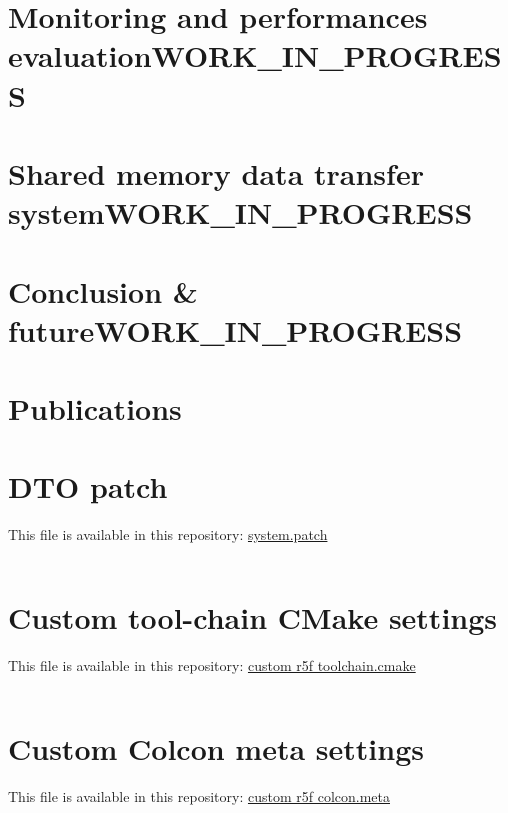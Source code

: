\documentclass[10pt]{article}
\begin{document}
\section{Monitoring and performances evaluation\hfill{}\textsc{WORK\_IN\_PROGRESS}}
\label{sec:orgccd1fd5}

\clearpage
\section{Shared memory data transfer system\hfill{}\textsc{WORK\_IN\_PROGRESS}}
\label{sec:org4aa4f86}


\clearpage
\section{Conclusion \& future\hfill{}\textsc{WORK\_IN\_PROGRESS}}
\label{sec:org0cff1f9}

\clearpage
\section{Publications}
\label{sec:org6e240ec}


\clearpage
\appendix
\section{DTO patch}
\label{sec:orgdbfa3da}
This file is available in this repository: \href{https://gitlab.com/sunoc/xilinx-kria-kv260-documentation/-/blob/b7300116e153f4b5a1542f8804e4646db8030033/src/system.patch}{system.patch}
\inputminted[linenos, frame=single]{diff}{./src/system.patch}

\clearpage
\section{Custom tool-chain CMake settings}
\label{sec:org7af2048}
This file is available in this repository: \href{https://gitlab.com/sunoc/xilinx-kria-kv260-documentation/-/blob/b7300116e153f4b5a1542f8804e4646db8030033/src/custom\_r5f\_toolchain.cmake}{custom r5f toolchain.cmake}
\inputminted[linenos, frame=single]{cmake}{./src/custom_r5f_toolchain.cmake}

\clearpage
\section{Custom Colcon meta settings}
\label{sec:org2e9cd58}
This file is available in this repository: \href{https://gitlab.com/sunoc/xilinx-kria-kv260-documentation/-/blob/b7300116e153f4b5a1542f8804e4646db8030033/src/custom\_r5f\_colcon.meta}{custom r5f colcon.meta}
\inputminted[linenos, frame=single]{yaml}{./src/custom_r5f_colcon.meta}
\end{document}

